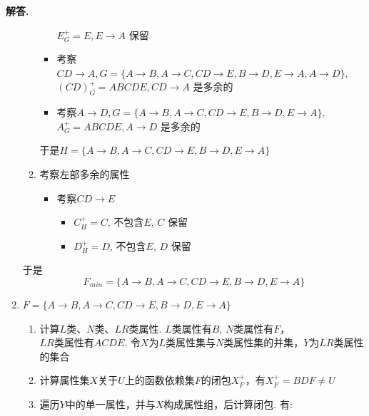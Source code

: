 \documentclass[12pt, a4paper, oneside]{ctexart}
\newenvironment{solution}{\par\noindent\textbf{解答. }}{\par}
\begin{document}
\begin{solution}
\begin{enumerate}[(1)]
\begin{enumerate}[$1^\circ$]
\begin{itemize}
                        $E_G^+ = E, E \rightarrow A$ 保留
                        \item 考察$CD \rightarrow A, G = \{ A \rightarrow B, A \rightarrow C, CD \rightarrow E, B \rightarrow D, E \rightarrow A, A \rightarrow D \},$ \\
                        $(CD)_G^+ = ABCDE, CD \rightarrow A$ 是多余的
                        \item 考察$A \rightarrow D, G = \{ A \rightarrow B, A \rightarrow C, CD \rightarrow E, B \rightarrow D, E \rightarrow A \},$ \\
                        $A_G^+ = ABCDE, A \rightarrow D$ 是多余的
                    \end{itemize}
                    于是$H = \{ A \rightarrow B, A \rightarrow C, CD \rightarrow E, B \rightarrow D, E \rightarrow A \}$
                \item 考察左部多余的属性
                    \begin{itemize}
                        \item 考察$CD \rightarrow E$
                            \begin{itemize}
                                \item $C_H^+ = C$, 不包含$E$, $C$ 保留
                                \item $D_H^+ = D$, 不包含$E$, $D$ 保留
                            \end{itemize}
                    \end{itemize}
            \end{enumerate}
            于是$$F_{min} = \{ A \rightarrow B, A \rightarrow C, CD \rightarrow E, B \rightarrow D, E \rightarrow A \}$$
        \item $F = \{ A \rightarrow B, A \rightarrow C, CD \rightarrow E, B \rightarrow D, E \rightarrow A \}$
            \begin{enumerate}[$1^\circ$]
                \item 计算$L$类、$N$类、$LR$类属性. $L$类属性有$B$, $N$类属性有$F$，\\
                $LR$类属性有$ACDE$. 令$X$为$L$类属性集与$N$类属性集的并集，$Y$为$LR$类属性的集合
                \item 计算属性集$X$关于$U$上的函数依赖集$F$的闭包$X_F^+$，有$X_F^+ = BDF \not= U$
                \item 遍历$Y$中的单一属性，并与$X$构成属性组，后计算闭包. 有:
                    \begin{itemize}

\end{itemize}
\end{enumerate}
\end{enumerate}
\end{solution}
\end{document}

